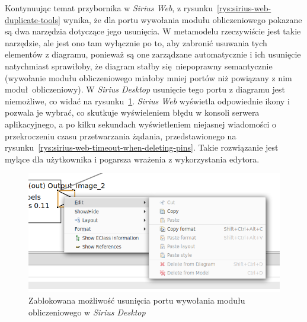 Kontynuując temat przybornika w \emph{Sirius Web}, z
rysunku~\ref{rys:sirius-web-duplicate-tools} wynika, że dla portu wywołania
modułu obliczeniowego pokazane są dwa narzędzia dotyczące jego usunięcia. W
metamodelu rzeczywiście jest takie narzędzie, ale jest ono tam wyłącznie po to,
aby zabronić usuwania tych elementów z diagramu, ponieważ są one zarządzane
automatycznie i ich usunięcie natychmiast sprawiłoby, że diagram stałby
się niepoprawny semantycznie (wywołanie modułu obliczeniowego miałoby mniej
portów niż powiązany z nim moduł obliczeniowy). W \emph{Sirius Desktop}
usunięcie tego portu z diagramu jest niemożliwe, co widać na
rysunku~\ref{rys:sirius-desktop-blocked-deleting-pins}.
\emph{Sirius Web} wyświetla odpowiednie ikony i pozwala je wybrać, co skutkuje
wyświeleniem błędu w konsoli serwera aplikacyjnego, a po kilku sekundach
wyświetleniem niejasnej wiadomości o przekroczeniu czasu przetwarzania żądania,
przedstawionego na rysunku~\ref{rys:sirius-web-timeout-when-deleting-pins}.
Takie rozwiązanie jest mylące dla użytkownika i pogarsza wrażenia z
wykorzystania edytora.

\begin{figure}[!hb]
  \centering

  \includegraphics[width=0.95\linewidth]{./images/sirius-desktop-blocked-deleting-pins.png}
  \caption{Zablokowana możliwość usunięcia portu wywołania modułu
    obliczeniowego w \emph{Sirius Desktop}}\label{rys:sirius-desktop-blocked-deleting-pins}
\end{figure}


